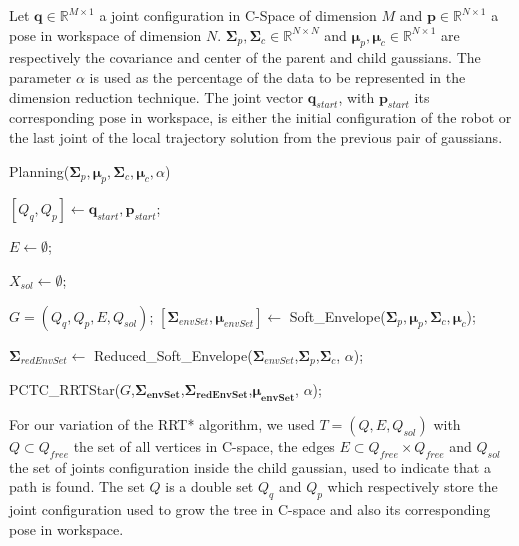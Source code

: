 \documentclass[letterpaper, 10 pt, conference]{ieeeconf}  %
\newcommand{\mb}[1]{{\boldsymbol{#1}}}
\begin{document}
Let $\mb{q} \in \mathbb{R}^{M \times 1}$ a joint configuration in C-Space of dimension $M$  and $\mb{p} \in \mathbb{R}^{N \times 1}$ a pose in workspace of dimension $N$. $\mb{\Sigma}_{p} , \mb{\Sigma}_{c} \in \mathbb{R}^{N \times N}$  and $\mb{\mu}_{p} , \mb{\mu}_{c} \in \mathbb{R}^{N \times 1}$ are respectively the covariance and center of the parent and child gaussians.
The parameter $\alpha$ is used as the percentage of the data to be represented in the dimension reduction technique. The joint vector $\mb{q}_{start}$, with $\mb{p}_{start}$ its corresponding pose in workspace, is either the initial configuration of the robot or the last joint of the local trajectory solution from the previous pair of gaussians. \\

\begin{algorithm}[H]
 \caption{Planning($\mb{\Sigma}_p,\mb{\mu}_p,\mb{\Sigma}_c,\mb{\mu}_c,\alpha$)}\label{planning}

\BlankLine
\setcounter{AlgoLine}{0}
$[Q_q,Q_p] \leftarrow \mb{q}_{start},\mb{p}_{start}$;

$E \leftarrow \emptyset$;

$X_{sol} \leftarrow \emptyset$;

$G=(Q_q,Q_p,E,Q_{sol})$;
\BlankLine
$[\mb{\Sigma}_{envSet},\mb{\mu}_{envSet}] \leftarrow$ Soft\_Envelope($\mb{\Sigma}_p,\mb{\mu}_p,\mb{\Sigma}_c,\mb{\mu}_c$);

$\mb{\Sigma}_{redEnvSet} \leftarrow$ Reduced\_Soft\_Envelope($\mb{\Sigma}_{envSet}$,$\mb{\Sigma}_{p}$,$\mb{\Sigma}_{c}$, $\alpha$);

\BlankLine
PCTC\_RRTStar($G$,$\mb{\Sigma_{envSet}}$,$\mb{\Sigma_{redEnvSet}}$,$\mb{\mu_{envSet}}$, $\alpha$);

\end{algorithm}
For our variation of the RRT* algorithm, we used  $T=(Q,E,Q_{sol})$ with $Q \subset Q_{free}$ the set of all vertices in C-space, the edges $E \subset Q_{free} \times Q_{free}$ and $Q_{sol}$ the set of joints configuration inside the child gaussian, used to indicate that a path is found. The set $Q$ is a double set $Q_q$ and $Q_p$ which respectively store the joint configuration used to grow the tree in C-space and also its corresponding pose in workspace. 
\end{document}
